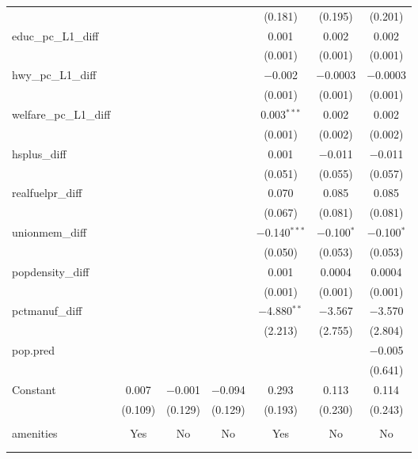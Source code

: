 \begin{table}[!htbp]
\begin{tabular}{@{\extracolsep{5pt}}lcccccc}
  &  &  &  & (0.181) & (0.195) & (0.201) \\ 
  educ\_pc\_L1\_diff &  &  &  & 0.001 & 0.002 & 0.002 \\ 
  &  &  &  & (0.001) & (0.001) & (0.001) \\ 
  hwy\_pc\_L1\_diff &  &  &  & $-$0.002 & $-$0.0003 & $-$0.0003 \\ 
  &  &  &  & (0.001) & (0.001) & (0.001) \\ 
  welfare\_pc\_L1\_diff &  &  &  & 0.003$^{***}$ & 0.002 & 0.002 \\ 
  &  &  &  & (0.001) & (0.002) & (0.002) \\ 
  hsplus\_diff &  &  &  & 0.001 & $-$0.011 & $-$0.011 \\ 
  &  &  &  & (0.051) & (0.055) & (0.057) \\ 
  realfuelpr\_diff &  &  &  & 0.070 & 0.085 & 0.085 \\ 
  &  &  &  & (0.067) & (0.081) & (0.081) \\ 
  unionmem\_diff &  &  &  & $-$0.140$^{***}$ & $-$0.100$^{*}$ & $-$0.100$^{*}$ \\ 
  &  &  &  & (0.050) & (0.053) & (0.053) \\ 
  popdensity\_diff &  &  &  & 0.001 & 0.0004 & 0.0004 \\ 
  &  &  &  & (0.001) & (0.001) & (0.001) \\ 
  pctmanuf\_diff &  &  &  & $-$4.880$^{**}$ & $-$3.567 & $-$3.570 \\ 
  &  &  &  & (2.213) & (2.755) & (2.804) \\ 
  pop.pred &  &  &  &  &  & $-$0.005 \\ 
  &  &  &  &  &  & (0.641) \\ 
  Constant & 0.007 & $-$0.001 & $-$0.094 & 0.293 & 0.113 & 0.114 \\ 
  & (0.109) & (0.129) & (0.129) & (0.193) & (0.230) & (0.243) \\ 
 \hline \\[-1.8ex] 
amenities & Yes & No & No & Yes & No & No \\ 
\hline \\[-1.8ex] 
\hline 
\hline \\[-1.8ex] 
\end{tabular} 
\end{table} 
